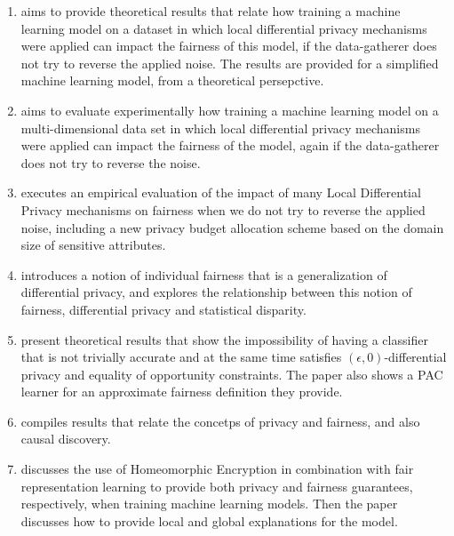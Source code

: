 \begin{enumerate}
\item \cite{A Systematic and Formal Study of the Impact of Local Differential Privacy on Fairness: Preliminary Results} aims to provide theoretical results that relate how training a machine learning model on a dataset in which local differential privacy mechanisms were applied can impact the fairness of this model, if the data-gatherer does not try to reverse the applied noise. The results are provided for a simplified machine learning model, from a theoretical persepctive.
\item \cite{On the impact of multi-dimensional local differential privacy on fairness} aims to evaluate experimentally how training a machine learning model on a multi-dimensional data set in which local differential privacy mechanisms were applied can impact the fairness of the model, again if the data-gatherer does not try to reverse the noise.
\item \cite{(Local) Differential Privacy has NO Disparate Impact on Fairness} executes an empirical evaluation of the impact of many Local Differential Privacy mechanisms on fairness when we do not try to reverse the applied noise, including a new privacy budget allocation scheme based on the domain size of sensitive attributes.
\item \cite{Awareness} introduces a notion of individual fairness that is a generalization of differential privacy, and explores the relationship between this notion of fairness, differential privacy and statistical disparity.
\item \cite{On the Compatibility of Privacy and Fairness} present theoretical results that show the impossibility of having a classifier that is not trivially accurate and at the same time satisfies $(\epsilon,0)$-differential privacy and equality of opportunity constraints. The paper also shows a PAC learner for an approximate fairness definition they provide.
\item \cite{Exploring fairness and privacy in machine learning} compiles results that relate the concetps of privacy and fairness, and also causal discovery.
\item \cite{Toward Learning Trustworthily from Data Combining Privacy, Fairness, and Explainability: An Application to Face Recognition} discusses the use of Homeomorphic Encryption in combination with fair representation learning \cite{Learning fair representations} to provide both privacy and fairness guarantees, respectively, when training machine learning models. Then the paper discusses how to provide local and global explanations for the model.
\end{enumerate}

